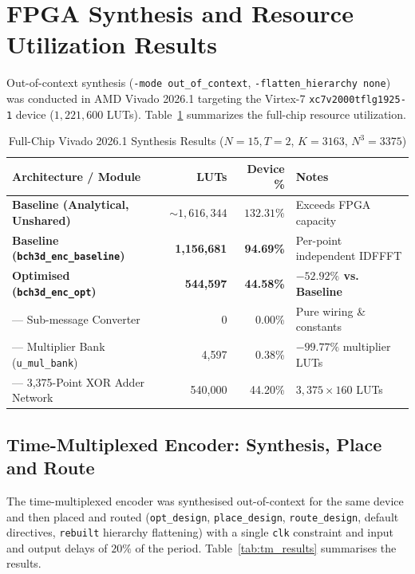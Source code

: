 \documentclass[11pt,a4paper]{article}
\begin{document}
\section{FPGA Synthesis and Resource Utilization Results}

Out-of-context synthesis (\texttt{-mode out\_of\_context}, \texttt{-flatten\_hierarchy none}) was conducted in AMD Vivado 2026.1 targeting the Virtex-7 \texttt{xc7v2000tflg1925-1} device ($1,221,600$ LUTs). Table~\ref{tab:synth_results} summarizes the full-chip resource utilization.

\begin{table}[htbp]
\centering
\caption{Full-Chip Vivado 2026.1 Synthesis Results ($N=15, T=2$, $K=3163$, $N^3=3375$)}
\label{tab:synth_results}
\vspace{0.2cm}
\begin{tabular}{lrrl}
\toprule
\textbf{Architecture / Module} & \textbf{LUTs} & \textbf{Device \%} & \textbf{Notes} \\
\midrule
\textbf{Baseline (Analytical, Unshared)} & $\sim 1,616,344$ & $132.31\%$ & Exceeds FPGA capacity \\
\textbf{Baseline (\texttt{bch3d\_enc\_baseline})} & \textbf{1,156,681} & \textbf{94.69\%} & Per-point independent IDFFFT \\
\midrule
\textbf{Optimised (\texttt{bch3d\_enc\_opt})} & \textbf{544,597} & \textbf{44.58\%} & \textbf{$-52.92\%$ vs. Baseline} \\
\midrule
--- Sub-message Converter & 0 & 0.00\% & Pure wiring \& constants \\
--- Multiplier Bank (\texttt{u\_mul\_bank}) & 4,597 & 0.38\% & $-99.77\%$ multiplier LUTs \\
--- 3,375-Point XOR Adder Network & 540,000 & 44.20\% & $3,375 \times 160$ LUTs \\
\bottomrule
\end{tabular}
\end{table}

\subsection{Time-Multiplexed Encoder: Synthesis, Place and Route}

The time-multiplexed encoder was synthesised out-of-context for the same device and then placed and routed (\texttt{opt\_design}, \texttt{place\_design}, \texttt{route\_design}, default directives, \texttt{rebuilt} hierarchy flattening) with a single \texttt{clk} constraint and input and output delays of $20\%$ of the period. Table~\ref{tab:tm_results} summarises the results.
\end{document}

